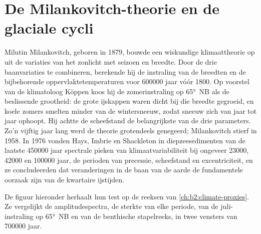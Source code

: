 \section{De Milankovitch-theorie en de glaciale cycli}\label{sec:b2:orbital-forcing:theory}

\begin{history}
Milutin Milankovitch, geboren in 1879, bouwde een wiskundige klimaattheorie op uit de variaties van het zonlicht met seizoen en breedte. Door de drie baanvariaties te combineren,
berekende hij de instraling van de breedten en de bijbehorende oppervlaktetemperaturen voor
\num{600000} jaar vóór 1800. Op voorstel van de klimatoloog Köppen koos hij de
zomerinstraling op \ang{65}~NB als de beslissende grootheid: de grote ijskappen waren dicht bij die
breedte gegroeid, en koele zomers smelten minder van de wintersneeuw, zodat sneeuw zich van jaar tot
jaar ophoopt. Hij achtte de scheefstand de belangrijkste van de drie parameters. Zo'n vijftig jaar lang
werd de theorie grotendeels genegeerd; Milankovitch stierf in 1958. In 1976 vonden Hays, Imbrie en Shackleton
in diepzeesedimenten van de laatste \num{450000} jaar spectrale pieken van klimaatvariabiliteit
bij ongeveer \num{23000}, \num{42000} en \num{100000} jaar, de perioden van precessie, scheefstand en
excentriciteit, en ze concludeerden dat veranderingen in de baan van de aarde de fundamentele oorzaak zijn van de
kwartaire ijstijden.
\end{history}

De figuur hieronder herhaalt hun test op de reeksen van \cref{ch:b2:climate-proxies}. Ze vergelijkt de
amplitudespectra, de sterkte van elke periode, van de juli-instraling op \ang{65}~NB en van de
benthische stapelreeks, in twee vensters van \num{700000} jaar.

